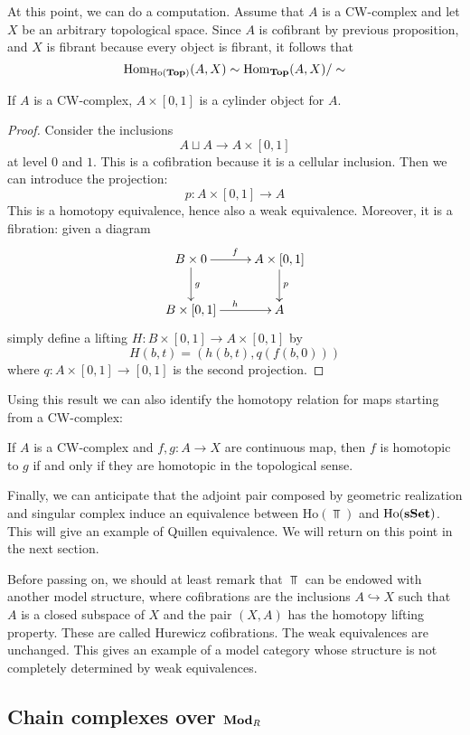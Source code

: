 \begin{refsection}
At this point, we can do a computation. Assume that $A$ is a CW-complex and let $X$ be an arbitrary topological space. Since $A$ is cofibrant by previous proposition, and $X$ is fibrant because every object is fibrant, it follows that
\[
\mathrm{Hom}_{\mathrm{Ho}(\mathbf{Top})}(A,X) \sim \mathrm{Hom}_{\mathbf{Top}}(A,X) / \sim
\]

\begin{prop}
If $A$ is a CW-complex, $A \times [0,1]$ is a cylinder object for $A$.
\end{prop}

\begin{proof}
Consider the inclusions
\[
A \sqcup A \to A \times [0,1]
\]
at level $0$ and $1$. This is a cofibration because it is a cellular inclusion. Then we can introduce the projection:
\[
p \colon A \times [0,1] \to A
\]
This is a homotopy equivalence, hence also a weak equivalence. Moreover, it is a fibration: given a diagram
\[
\xymatrix{
B \times 0 \ar[d]^g \ar[r]^f & A \times [0,1] \ar[d]^p \\ B \times [0,1] \ar[r]^h & A
}
\]
simply define a lifting $H \colon B \times [0,1] \to A \times [0,1]$ by
\[
H(b,t) = (h(b,t),q(f(b,0)))
\]
where $q \colon A \times [0,1] \to [0,1]$ is the second projection.
\end{proof}

Using this result we can also identify the homotopy relation for maps starting from a CW-complex:

\begin{prop}
If $A$ is a CW-complex and $f,g \colon A \to X$ are continuous map, then $f$ is homotopic to $g$ if and only if they are homotopic in the topological sense.
\end{prop}

Finally, we can anticipate that the adjoint pair composed by geometric realization and singular complex induce an equivalence between $\mathrm{Ho}(\Top)$ and $\mathrm{Ho}(\mathbf{s\,\!\mathbf{Set}})$. This will give an example of Quillen equivalence. We will return on this point in the next section.

Before passing on, we should at least remark that $\Top$ can be endowed with another model structure, where cofibrations are the inclusions $A \hookrightarrow X$ such that $A$ is a closed subspace of $X$ and the pair $(X,A)$ has the homotopy lifting property. These are called Hurewicz cofibrations. The weak equivalences are unchanged. This gives an example of a model category whose structure is not completely determined by weak equivalences.

\subsection{Chain complexes over $\mathbf{Mod}_R$}


\end{refsection}
